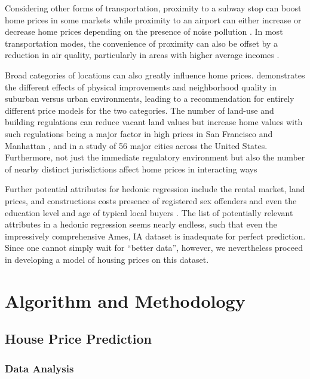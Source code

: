 \documentclass[fleqn,10pt]{SelfArx} %
\begin{document}
Considering other forms of transportation, proximity to a subway stop can boost home prices in some markets  while proximity to an airport can either increase or decrease home prices depending on the presence of noise pollution . In most transportation modes, the convenience of proximity can also be offset by a reduction in air quality, particularly in areas with higher average incomes .

Broad categories of locations can also greatly influence home prices.  demonstrates the different effects of physical improvements and neighborhood quality in suburban versus urban environments, leading to a recommendation for entirely different price models for the two categories. The number of land-use and building regulations can reduce vacant land values but increase home values  with such regulations being a major factor in high prices in San Francisco  and Manhattan , and in a study of 56 major cities across the United States. Furthermore, not just the immediate regulatory environment but also the number of nearby distinct jurisdictions affect home prices in interacting ways 

Further potential attributes for hedonic regression include the rental market, land prices, and constructions costs  presence of registered sex offenders  and even the education level and age of typical local buyers . The list of potentially relevant attributes in a hedonic regression seems nearly endless, such that even the impressively comprehensive Ames, IA dataset is inadequate for perfect prediction. Since one cannot simply wait for ``better data'', however, we nevertheless proceed in developing a model of housing prices on this dataset.


\section{Algorithm and Methodology}
\subsection{House Price Prediction}

 \subsubsection{Data Analysis}
\end{document}
